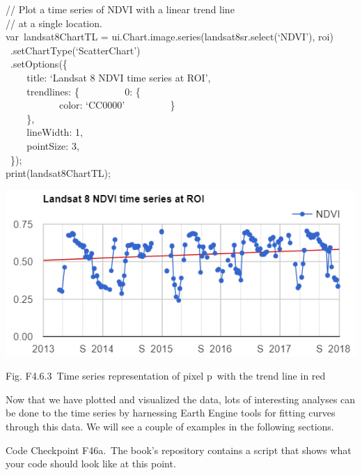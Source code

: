 \documentclass[
  letterpaper,
  DIV=11,
  numbers=noendperiod]{scrreprt}
\begin{document}
// Plot a time series of NDVI with a linear trend line\\
// at a single location.\\
var~landsat8ChartTL = ui.Chart.image.series(landsat8sr.select(`NDVI'),
roi)\\
\hspace*{0.333em} ~.setChartType(`ScatterChart')\\
\hspace*{0.333em} ~.setOptions(\{\\
\hspace*{0.333em} ~ ~ ~title: `Landsat 8 NDVI time series at ROI',\\
\hspace*{0.333em} ~ ~ ~trendlines: \{~ ~ ~ ~ ~ ~0: \{\\
\hspace*{0.333em} ~ ~ ~ ~ ~ ~ ~color: `CC0000'~ ~ ~ ~ ~ ~\}\\
\hspace*{0.333em} ~ ~ ~\},\\
\hspace*{0.333em} ~ ~ ~lineWidth: 1,\\
\hspace*{0.333em} ~ ~ ~pointSize: 3,\\
\hspace*{0.333em} ~\});\\
print(landsat8ChartTL);

\includegraphics{./F4/image82.png}

Fig. F4.6.3~Time series representation of pixel p~with the trend line in
red

Now that we have plotted and visualized the data, lots of interesting
analyses can be done to the time series by harnessing Earth Engine tools
for fitting curves through this data. We will see a couple of examples
in the following sections.

\begin{tcolorbox}[enhanced jigsaw, left=2mm, breakable, rightrule=.15mm, opacityback=0, colframe=quarto-callout-note-color-frame, colbacktitle=quarto-callout-note-color!10!white, arc=.35mm, opacitybacktitle=0.6, toptitle=1mm, colback=white, leftrule=.75mm, title=\textcolor{quarto-callout-note-color}{\faInfo}\hspace{0.5em}{Note}, toprule=.15mm, bottomtitle=1mm, titlerule=0mm, bottomrule=.15mm, coltitle=black]

Code Checkpoint F46a.~The book's repository contains a script that shows
what your code should look like at this point.

\end{tcolorbox}
\end{document}
